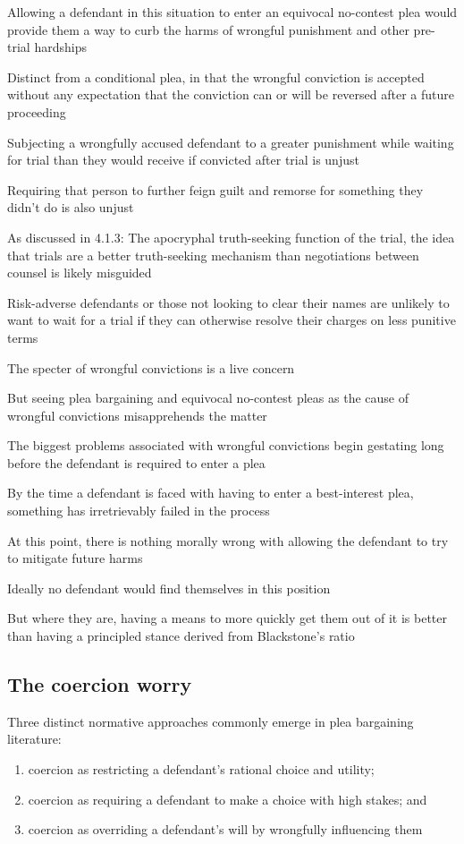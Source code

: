 Allowing a defendant in this situation to enter an equivocal no-contest plea would provide them a way to curb the harms of wrongful punishment and other pre-trial hardships

Distinct from a conditional plea, in that the wrongful conviction is accepted without any expectation that the conviction can or will be reversed after a future proceeding

Subjecting a wrongfully accused defendant to a greater punishment while waiting for trial than they would receive if convicted after trial is unjust

Requiring that person to further feign guilt and remorse for something they didn't do is also unjust

As discussed in 4.1.3: The apocryphal truth-seeking function of the trial, the idea that trials are a better truth-seeking mechanism than negotiations between counsel is likely misguided

Risk-adverse defendants or those not looking to clear their names are unlikely to want to wait for a trial if they can otherwise resolve their charges on less punitive terms

The specter of wrongful convictions is a live concern

But seeing plea bargaining and equivocal no-contest pleas as the cause of wrongful convictions misapprehends the matter

The biggest problems associated with wrongful convictions begin gestating long before the defendant is required to enter a plea

By the time a defendant is faced with having to enter a best-interest plea, something has irretrievably failed in the process

At this point, there is nothing morally wrong with allowing the defendant to try to mitigate future harms

Ideally no defendant would find themselves in this position

But where they are, having a means to more quickly get them out of it is better than having a principled stance derived from Blackstone's ratio

\subsection{The coercion worry}

Three distinct normative approaches commonly emerge in plea bargaining literature:

\begin{enumerate}
    \item coercion as restricting a defendant's rational choice and utility;
    \item coercion as requiring a defendant to make a choice with high stakes; and
    \item coercion as overriding a defendant's will by wrongfully influencing them
\end{enumerate}

